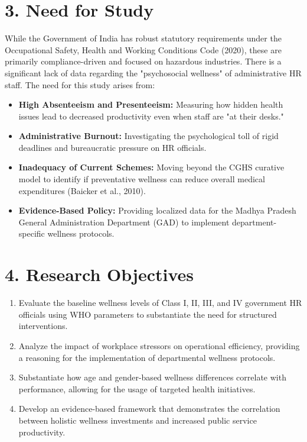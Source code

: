\documentclass[11pt,a4paper]{article}
\begin{document}
\section{3. Need for Study}
\vspace{0.2cm}
While the Government of India has robust statutory requirements under the Occupational Safety, Health and Working Conditions Code (2020), these are primarily compliance-driven and focused on hazardous industries. There is a significant lack of data regarding the "psychosocial wellness" of administrative HR staff. The need for this study arises from:
\begin{itemize}
    \item \textbf{High Absenteeism and Presenteeism:} Measuring how hidden health issues lead to decreased productivity even when staff are "at their desks."
    \item \textbf{Administrative Burnout:} Investigating the psychological toll of rigid deadlines and bureaucratic pressure on HR officials.
    \item \textbf{Inadequacy of Current Schemes:} Moving beyond the CGHS curative model to identify if preventative wellness can reduce overall medical expenditures (Baicker et al., 2010).
    \item \textbf{Evidence-Based Policy:} Providing localized data for the Madhya Pradesh General Administration Department (GAD) to implement department-specific wellness protocols.
\end{itemize}

\section{4. Research Objectives}
\vspace{0.2cm}
\begin{navybox}
\begin{enumerate}[label={\color{navyblue}\bfseries\arabic*.}, itemsep=6pt]
    \item Evaluate the baseline wellness levels of Class I, II, III, and IV government HR officials using WHO parameters to substantiate the need for structured interventions.
    \item Analyze the impact of workplace stressors on operational efficiency, providing a reasoning for the implementation of departmental wellness protocols.
    \item Substantiate how age and gender-based wellness differences correlate with performance, allowing for the usage of targeted health initiatives.
    \item Develop an evidence-based framework that demonstrates the correlation between holistic wellness investments and increased public service productivity.
\end{enumerate}
\end{navybox}
\end{document}
